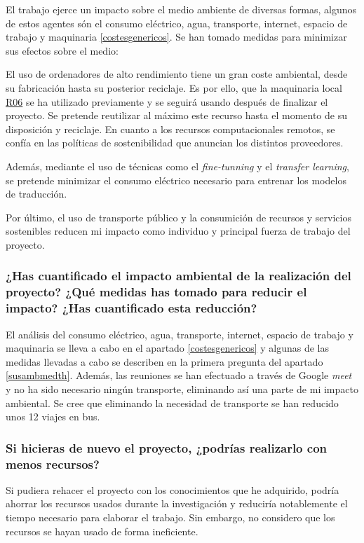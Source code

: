 El trabajo ejerce un impacto sobre el medio ambiente de diversas formas, algunos de estos
agentes són el consumo eléctrico, agua, transporte, internet, espacio de trabajo y maquinaria \ref{costesgenericos}.
Se han tomado medidas para minimizar sus efectos sobre el medio:

El uso de ordenadores de alto rendimiento tiene un gran coste ambiental,
desde su fabricación hasta su posterior reciclaje. Es por ello, que la maquinaria
local \hyperref[R06]{R06} se ha utilizado previamente y se seguirá usando después de
finalizar el proyecto. Se pretende reutilizar al máximo este recurso hasta el
momento de su disposición y reciclaje.
En cuanto a los recursos computacionales remotos, se confía en las políticas de sostenibilidad
\cite{awssustainability} que anuncian los distintos proveedores.

Además, mediante el uso de técnicas como el \textit{fine-tunning} y el
\textit{transfer learning}, se pretende minimizar el consumo eléctrico necesario para
entrenar los modelos de traducción.

Por último, el uso de transporte público y la consumición de recursos y servicios sostenibles
reducen mi impacto como individuo y principal fuerza de trabajo del proyecto. 

\subsubsection{¿Has cuantificado el impacto ambiental de la realización del proyecto? ¿Qué medidas has tomado para reducir el impacto? ¿Has cuantificado esta reducción?}

El análisis del consumo eléctrico, agua, transporte, internet, espacio de trabajo y maquinaria se lleva a cabo en el apartado \ref{costesgenericos} y algunas de las medidas llevadas a cabo se describen en la primera pregunta del apartado \ref{susambmedth}. Además, las reuniones se han efectuado a través de Google \textit{meet} y no ha sido necesario ningún transporte, eliminando así una parte de mi impacto ambiental.
Se cree que eliminando la necesidad de transporte se han reducido unos 12 viajes en bus.

\subsubsection{Si hicieras de nuevo el proyecto, ¿podrías realizarlo con menos recursos?}

Si pudiera rehacer el proyecto con los conocimientos que he adquirido, podría ahorrar los recursos usados durante la investigación y reduciría notablemente el tiempo necesario para elaborar el trabajo. Sin embargo, no considero que los recursos se hayan usado de forma ineficiente.

